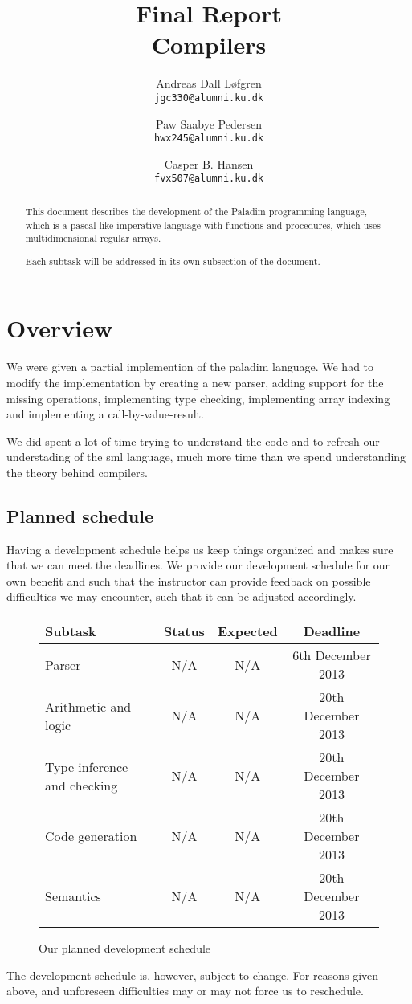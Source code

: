 \documentclass[11pt]{article}
\title%
{%
	{\large Final Report}\\
	Compilers
}
\author%
{%
	Andreas Dall Løfgren\\
	{\tt jgc330@alumni.ku.dk}
	\and
	Paw Saabye Pedersen\\
	{\tt hwx245@alumni.ku.dk}
	\and
	Casper B. Hansen\\
	{\tt fvx507@alumni.ku.dk}
}
\begin{document}
\lstset{basicstyle=\ttfamily\scriptsize}
\clearpage
\maketitle
\thispagestyle{empty}
\begin{multicols}{2}
\begin{abstract}
This document describes the development of the Paladim programming language, which is a pascal-like imperative language with functions and procedures, which uses multidimensional regular arrays.

Each subtask will be addressed in its own subsection of the document.
\end{abstract}
\vfill
\columnbreak%
\tableofcontents
\end{multicols}

\clearpage
\section*{Overview}
We were given a partial implemention of the paladim language. We had to modify the implementation by creating a new parser, adding support for the missing operations, implementing type checking, implementing array indexing and implementing a call-by-value-result.

We did spent a lot of time trying to understand the code and to refresh our understading of the sml language, much more time than we spend understanding the theory behind compilers.

\subsection*{Planned schedule}
Having a development schedule helps us keep things organized and makes sure that we can meet the deadlines. We provide our development schedule for our own benefit and such that the instructor can provide feedback on possible difficulties we may encounter, such that it can be  adjusted accordingly.
\begin{figure}[H]
	\centering
	\begin{tabular}{|l|c|c|c|}
		\hline
		{\bf Subtask} & {\bf Status} & {\bf Expected} & {\bf Deadline} \\ \hline
		Parser & N/A & N/A & 6th December 2013 \\ \hline
		Arithmetic and logic & N/A & N/A & 20th December 2013 \\ \hline
		Type inference- and checking & N/A & N/A & 20th December 2013 \\ \hline
		Code generation & N/A & N/A & 20th December 2013 \\ \hline
		Semantics & N/A & N/A & 20th December 2013 \\ \hline
	\end{tabular}
	\label{table:schedule}
	\caption{Our planned development schedule}
\end{figure}
The development schedule is, however, subject to change. For reasons given above, and unforeseen difficulties may or may not force us to reschedule.
\end{document}
